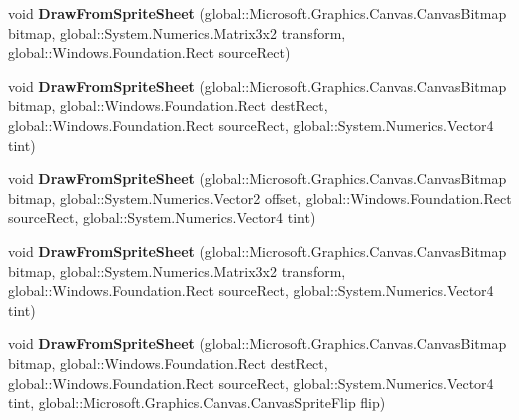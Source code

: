 \begin{DoxyCompactItemize}
void {\bfseries Draw\+From\+Sprite\+Sheet} (global\+::\+Microsoft.\+Graphics.\+Canvas.\+Canvas\+Bitmap bitmap, global\+::\+System.\+Numerics.\+Matrix3x2 transform, global\+::\+Windows.\+Foundation.\+Rect source\+Rect)
\item 
\mbox{\label{class_microsoft_1_1_graphics_1_1_canvas_1_1_canvas_sprite_batch_ad98b847473221fdac7fbd14a5b9be240}} 
void {\bfseries Draw\+From\+Sprite\+Sheet} (global\+::\+Microsoft.\+Graphics.\+Canvas.\+Canvas\+Bitmap bitmap, global\+::\+Windows.\+Foundation.\+Rect dest\+Rect, global\+::\+Windows.\+Foundation.\+Rect source\+Rect, global\+::\+System.\+Numerics.\+Vector4 tint)
\item 
\mbox{\label{class_microsoft_1_1_graphics_1_1_canvas_1_1_canvas_sprite_batch_af857e8b6752567fefd4c6a81a75b2e21}} 
void {\bfseries Draw\+From\+Sprite\+Sheet} (global\+::\+Microsoft.\+Graphics.\+Canvas.\+Canvas\+Bitmap bitmap, global\+::\+System.\+Numerics.\+Vector2 offset, global\+::\+Windows.\+Foundation.\+Rect source\+Rect, global\+::\+System.\+Numerics.\+Vector4 tint)
\item 
\mbox{\label{class_microsoft_1_1_graphics_1_1_canvas_1_1_canvas_sprite_batch_a757d700dcc20d105cec1a69997f48951}} 
void {\bfseries Draw\+From\+Sprite\+Sheet} (global\+::\+Microsoft.\+Graphics.\+Canvas.\+Canvas\+Bitmap bitmap, global\+::\+System.\+Numerics.\+Matrix3x2 transform, global\+::\+Windows.\+Foundation.\+Rect source\+Rect, global\+::\+System.\+Numerics.\+Vector4 tint)
\item 
\mbox{\label{class_microsoft_1_1_graphics_1_1_canvas_1_1_canvas_sprite_batch_a1a86d8b0f90e3534b1f78de4ab54d5b6}} 
void {\bfseries Draw\+From\+Sprite\+Sheet} (global\+::\+Microsoft.\+Graphics.\+Canvas.\+Canvas\+Bitmap bitmap, global\+::\+Windows.\+Foundation.\+Rect dest\+Rect, global\+::\+Windows.\+Foundation.\+Rect source\+Rect, global\+::\+System.\+Numerics.\+Vector4 tint, global\+::\+Microsoft.\+Graphics.\+Canvas.\+Canvas\+Sprite\+Flip flip)
\item 
\mbox{\label{class_microsoft_1_1_graphics_1_1_canvas_1_1_canvas_sprite_batch_afb583c7529206d1438558f6816c5e862}} 

\end{DoxyCompactItemize}
